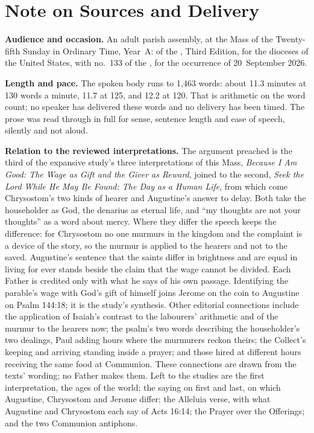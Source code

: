 
\section*{Note on Sources and Delivery}

{\small

\textbf{Audience and occasion.} An adult parish assembly, at the Mass of the
Twenty-fifth Sunday in Ordinary Time, Year~A:  of the , Third Edition, for the dioceses of the
United States, with no.~133 of the , for the
occurrence of 20~September 2026.

\textbf{Length and pace.} The spoken body runs to 1,463 words: about 11.3 minutes at
130 words a minute, 11.7 at 125, and 12.2 at 120. That is arithmetic on the
word count; no speaker has delivered these words and no delivery has been
timed. The prose was read through in full for sense, sentence length and
ease of speech, silently and not aloud.

\textbf{Relation to the reviewed interpretations.} The argument preached is
the third of the expansive study's three interpretations of this Mass,
\textit{Because I Am Good: The Wage as Gift and the Giver as Reward}, joined
to the second, \textit{Seek the Lord While He May Be Found: The Day as a
Human Life}, from which come Chrysostom's two kinds of hearer and
Augustine's answer to delay. Both take the householder as God, the denarius
as eternal life, and ``my thoughts are not your thoughts'' as a word about
mercy. Where they differ the speech keeps the difference: for Chrysostom no
one murmurs in the kingdom and the complaint is a device of the story, so
the murmur is applied to the hearers and not to the saved. Augustine's
sentence that the saints differ in brightness and are equal in living for
ever stands beside the claim that the wage cannot be divided. Each Father is
credited only with what he says of his own passage. Identifying the parable's
wage with God's gift of himself joins Jerome on the coin to Augustine on
Psalm 144:18; it is the study's synthesis. Other editorial connections include
the application of Isaiah's contrast to the labourers' arithmetic and of the
murmur to the hearers now; the psalm's two
words describing the householder's two dealings, Paul adding hours where
the murmurers reckon theirs; the Collect's keeping and arriving standing
inside a prayer; and those hired at different hours receiving the same food
at Communion. These connections are drawn from the texts' wording; no Father
makes them. Left
to the studies are the first interpretation, the ages of the world; the
saying on first and last, on which Augustine, Chrysostom and Jerome differ;
the Alleluia verse, with what Augustine and Chrysostom each say of Acts
16:14; the Prayer over the Offerings; and the two Communion antiphons.

}
